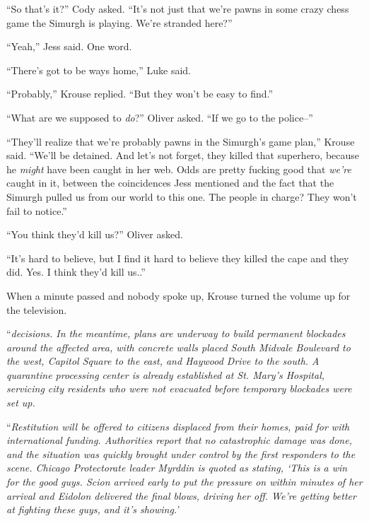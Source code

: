 ``So that's it?'' Cody asked.  ``It's not just that we're pawns in some crazy chess game the Simurgh is playing.  We're stranded here?''



``Yeah,'' Jess said.  One word.



``There's got to be ways home,'' Luke said.



``Probably,'' Krouse replied.  ``But they won't be easy to find.''



``What are we supposed to \emph{do}?'' Oliver asked.  ``If we go to the police--''



``They'll realize that we're probably pawns in the Simurgh's game plan,'' Krouse said.  ``We'll be detained.  And let's not forget, they killed that superhero, because he \emph{might} have been caught in her web.  Odds are pretty fucking good that \emph{we're} caught in it, between the coincidences Jess mentioned and the fact that the Simurgh pulled us from our world to this one.  The people in charge?  They won't fail to notice.''



``You think they'd kill us?'' Oliver asked.



``It's hard to believe, but I find it hard to believe they killed the cape and they did.  Yes.  I think they'd kill us..''



When a minute passed and nobody spoke up, Krouse turned the volume up for the television.



``\emph{\ldotsfinal decisions.  In the meantime, plans are underway to build permanent blockades around the affected area, with concrete walls placed South Midvale Boulevard to the west, Capitol Square to the east, and Haywood Drive to the south.  A quarantine processing center is already established at St. Mary's Hospital, servicing city residents who were not evacuated before temporary blockades were set up.}



``\emph{Restitution will be offered to citizens displaced from their homes, paid for with international funding.  Authorities report that no catastrophic damage was done, and the situation was quickly brought under control by the first responders to the scene.  Chicago Protectorate leader Myrddin is quoted as stating, `This is a win for the good guys.  Scion arrived early to put the pressure on within minutes of her arrival and Eidolon delivered the final blows, driving her off.  We're getting better at fighting these guys, and it's showing.'}



